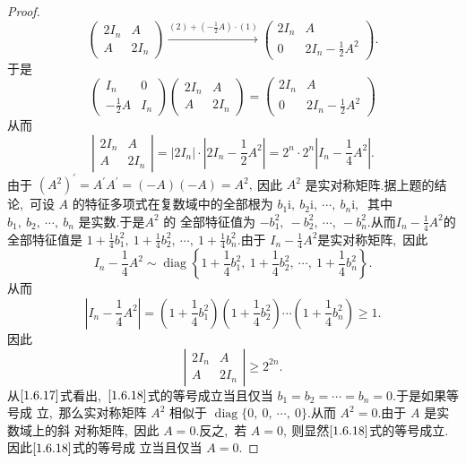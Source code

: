 \begin{proof}
	$$\left(\begin{array}{cc}2 I_{n} & A \\ A & 2 I_{n}\end{array}\right) \xrightarrow{(2)+\left(-\frac{1}{2} A\right) \cdot (1)}\left(\begin{array}{cc}2 I_{n} & A \\ 0 & 2 I_{n}-\frac{1}{2} A^{2}\end{array}\right).$$
	于是
	$$\left(\begin{array}{cc}
		I_{n} & 0 \\
		-\frac{1}{2} A & I_{n}
	\end{array}\right)\left(\begin{array}{cc}
		2 I_{n} & A \\
		A & 2 I_{n}
	\end{array}\right)=\left(\begin{array}{cc}
		2 I_{n} & A \\
		0 & 2 I_{n}-\frac{1}{2} A^{2}
	\end{array}\right)$$
	从而
	$$\left|\begin{array}{cc}
		2 I_{n} & A \\
		A & 2 I_{n}
	\end{array}\right|=
	\left|2 I_{n}\right| \cdot\left|2 I_{n}-\frac{1}{2} A^{2}\right|=
	2^{n} \cdot 2^{n}\left|I_{n}-\frac{1}{4} A^{2}\right|.$$
	由于  $\left(A^{2}\right)^{\prime}=A^{\prime} A^{\prime}=(-A)(-A)=A^{2} ,\  $因此  $A^{2} $ 是实对称矩阵.据上题的结论,\  可设 $ A $ 的特征多项式在复数域中的全部根为 $ b_{1} \mathrm{i},\  b_{2} \mathrm{i},\  \cdots,\  b_{n} \mathrm{i} ,\ $ 其中  $b_{1},\  b_{2},\  \cdots,\  b_{n} $ 是实数.于是$  A^{2} $ 的
	全部特征值为 $ -b_{1}^{2},\ -b_{2}^{2},\  \cdots,\ -b_{n}^{2}  .$从而$  I_{n}-\frac{1}{4} A^{2}  $的全部特征值是 $ 1+\frac{1}{4} b_{1}^{2},\  1+\frac{1}{4} b_{2}^{2},\  \cdots ,\   1+\frac{1}{4} b_{n}^{2}  .$由于  $I_{n}-\frac{1}{4} A^{2}  $是实对称矩阵,\  因此
	$$I_{n}-\frac{1}{4} A^{2} \sim \operatorname{diag}\left\{1+\frac{1}{4} b_{1}^{2},\  1+\frac{1}{4} b_{2}^{2},\  \cdots,\  1+\frac{1}{4} b_{n}^{2}\right\} .$$
	从而
	\begin{equation}
		\left|I_{n}-\frac{1}{4} A^{2}\right|=\left(1+\frac{1}{4} b_{1}^{2}\right)\left(1+\frac{1}{4} b_{2}^{2}\right) \cdots\left(1+\frac{1}{4} b_{n}^{2}\right) \geqslant 1 .\label{1.6.17}
	\end{equation}
	因此
	\begin{equation}
		\left|\begin{array}{cc}
			2 I_{n} & A \\
			A & 2 I_{n}
		\end{array}\right| \geqslant 2^{2 n} .\label{1.6.18}
	\end{equation}
	从$\eqref{1.6.17}$式看出,\ $\eqref{1.6.18}$式的等号成立当且仅当  $b_{1}=b_{2}=\cdots=b_{n}=0  .$于是如果等号成 立,\  那么实对称矩阵 $ A^{2} $ 相似于 $ \operatorname{diag}\{0,\ 0,\  \cdots,\  0\}  .$从而  $A^{2}=0  .$由于 $ A$  是实数域上的斜 对称矩阵,\  因此  $A=0  .$反之,\  若 $ A=0 ,\  $则显然$\eqref{1.6.18} $式的等号成立.因此$\eqref{1.6.18}$式的等号成 立当且仅当  $A=0 .$
\end{proof}
